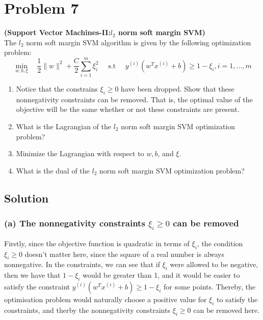 \section*{Problem 7}

\textbf{(Support Vector Machines-II:\@ \( l_{2}
    \) norm soft margin SVM)}\\
The \( l_{2} \) norm soft margin SVM algorithm is given by the following optimization problem:
\[
    \min _{w, b, \xi} \quad \frac{1}{2}\|w\|^{2}+\frac{C}{2} \sum_{i=1}^{m} \xi_{i}^{2} \quad \text { s.t } \quad y^{(i)}\left(w^{T} x^{(i)}+b\right) \geq 1-\xi_{i}, i=1, \ldots, m
\]
\begin{enumerate}[label= (\alph*), noitemsep, topsep=0pt]
    \item Notice that the constrains \( \xi_{i} \geq 0 \) have been dropped.
          Show that these nonnegativity constraints can be removed.
          That is, the optimal value of the objective will be the same whether or not these constraints are present.

    \item What is the Lagrangian of the \( l_{2} \) norm soft margin SVM optimization problem?

    \item Minimize the Lagrangian with respect to \( w, b \), and \( \xi \).

    \item What is the dual of the \( l_{2} \) norm soft margin SVM optimization problem?
\end{enumerate}

\subsection*{Solution}

\subsubsection*{(a) The nonnegativity constraints \( \xi_{i} \geq 0 \) can be removed}

Firstly, since the objective function is quadratic in terms of \( \xi_{i} \), the condition \( \xi_{i} \geq 0 \) doesn't matter here, since the square of a real number is always nonnegative.
In the constraints, we can see that if \( \xi_{i} \) were allowed to be negative, then we have that \( 1 - \xi_{i} \) would be greater than 1, and it would be easier to satisfy the constraint \( y^{(i)}\left(w^{T} x^{(i)}+b\right) \geq 1-\xi_{i} \) for some points.
Thereby, the optimisation problem would naturally choose a positive value for \( \xi_{i} \) to satisfy the constraints, and therby the nonnegativity constraints \( \xi_{i} \geq 0 \) can be removed here.

